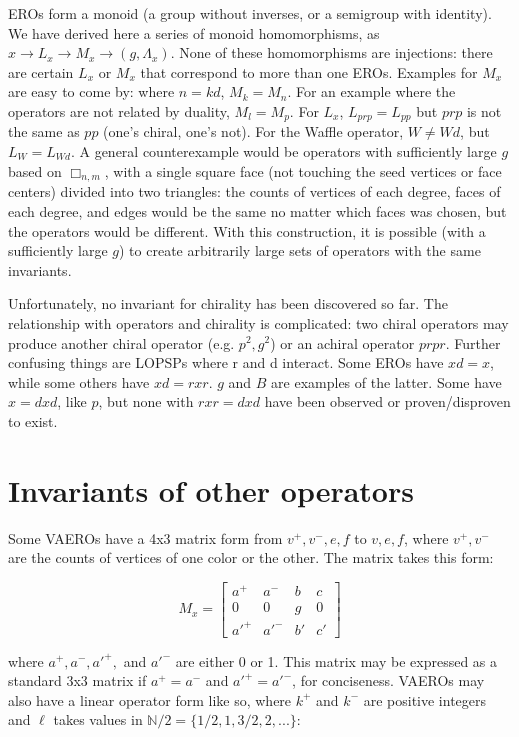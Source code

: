 \documentclass{amsart}[12pt]
\begin{document}
EROs form a monoid (a group without inverses, or a semigroup with identity).
We have derived here a series of monoid homomorphisms, as
$ x \to L_x \to M_x \to (g, \Lambda_x)$.
None of these homomorphisms are injections: there are certain
$L_x$ or $M_x$ that correspond to more than one EROs. Examples for $M_x$ are
easy to come by: where $n = kd$, $M_k = M_n$. For an example where the
operators are not related by duality, $M_l = M_p$. For $L_x$, $L_{prp} =
L_{pp}$ but $prp$ is not the same as $pp$ (one's chiral, one's not). For the
Waffle operator, $W \ne Wd$, but $L_W = L_{Wd}$. A general counterexample would
be operators with sufficiently large $g$ based on $\Box_{n,m}$, with a single
square face (not touching the seed vertices or face centers) divided into two
triangles: the counts of vertices of each degree, faces of each degree, and
edges would be the same no matter which faces was chosen, but the operators
would be different. With this construction, it is possible (with a sufficiently
large $g$) to create arbitrarily large sets of operators with the same
invariants.

Unfortunately, no invariant for chirality has been discovered so far. The
relationship with operators and chirality is complicated: two chiral operators
may produce another chiral operator (e.g. $p^2, g^2$) or an achiral operator
$prpr$. Further confusing things are LOPSPs where r and d interact. Some EROs
have $xd = x$, while some others have $xd = rxr$. $g$ and $B$ are examples of
the latter. Some have $x = dxd$, like $p$, but none with $rxr = dxd$ have been
observed or proven/disproven to exist.

\section{Invariants of other operators}
Some VAEROs have a 4x3 matrix form from $v^+, v^-, e, f$ to $v, e, f$, where
$v^+, v^-$ are the counts of vertices of one color or the other. The matrix takes
this form:

\begin{equation}
  M_x = \begin{bmatrix}
  a^+ & a^- & b & c \\
  0 & 0 & g & 0 \\
  a'^+ & a'^- & b' & c' \end{bmatrix}
\end{equation}

where $a^+, a^-, a'^+,$ and $a'^-$ are either 0 or 1. This matrix may be
expressed as a standard 3x3 matrix if $a^+ = a^-$ and $a'^+ = a'^-$, for
conciseness.
VAEROs may also have a linear operator form like so,
where $k^+$ and $k^-$ are positive integers and $\ell$ takes values in
$\mathbb{N}/2 = \{1/2, 1, 3/2, 2, ...\}$:
\end{document}
